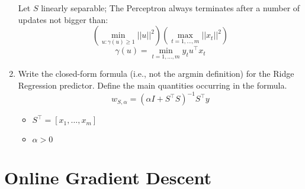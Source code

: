 \documentclass[a4paper]{article}
\begin{document}
\begin{enumerate}
    Let $S$ linearly separable; The Perceptron always terminates after a number of updates
    not bigger than:
    $$ \left(\min_{u:\gamma(u)\geq 1}||u||^2\right)
       \left(\max_{t=1,\dots,m}||x_t||^2\right) $$
    $$ \gamma(u) = \min_{t=1,\dots,m} y_tu^\top x_t$$
    \item Write the closed-form formula (i.e., not the argmin definition) for the Ridge
    Regression predictor. Define the main quantities occurring in the formula.
    $$ w_{S,\alpha} = (\alpha I + S^\top S)^{-1}S^\top y $$
    \begin{itemize}
        \item $S^\top = [x_1,\dots ,x_m] $
        \item $\alpha >0$
    \end{itemize}
\end{enumerate}
\section{Online Gradient Descent}
\end{document}
